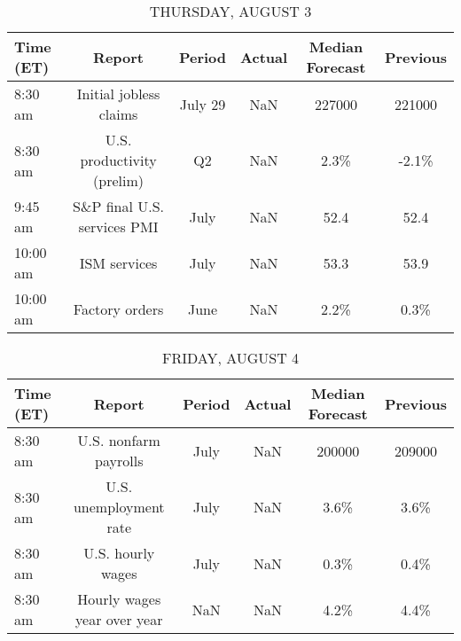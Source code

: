 \documentclass{article}%
\begin{document}
%


\begin{table}[htbp]%
\caption{THURSDAY, AUGUST 3}%
\centering%
\begin{adjustbox}{width=1\textwidth}%
\begin{tabular}{lccccc}
\toprule
Time (ET) &                      Report &  Period & Actual & Median Forecast & Previous \\
\midrule
  8:30 am &      Initial jobless claims & July 29 &    NaN &          227000 &   221000 \\
  8:30 am &  U.S. productivity (prelim) &      Q2 &    NaN &            2.3\% &    -2.1\% \\
  9:45 am & S\&P final U.S. services PMI &    July &    NaN &            52.4 &     52.4 \\
 10:00 am &                ISM services &    July &    NaN &            53.3 &     53.9 \\
 10:00 am &              Factory orders &    June &    NaN &            2.2\% &     0.3\% \\
\bottomrule
\end{tabular}
%
\end{adjustbox}%
\end{table}

%


\begin{table}[htbp]%
\caption{FRIDAY, AUGUST 4}%
\centering%
\begin{adjustbox}{width=1\textwidth}%
\begin{tabular}{lccccc}
\toprule
Time (ET) &                      Report & Period & Actual & Median Forecast & Previous \\
\midrule
  8:30 am &       U.S. nonfarm payrolls &   July &    NaN &          200000 &   209000 \\
  8:30 am &      U.S. unemployment rate &   July &    NaN &            3.6\% &     3.6\% \\
  8:30 am &           U.S. hourly wages &   July &    NaN &            0.3\% &     0.4\% \\
  8:30 am & Hourly wages year over year &    NaN &    NaN &            4.2\% &     4.4\% \\
\bottomrule
\end{tabular}
%
\end{adjustbox}%
\end{table}
\end{document}
